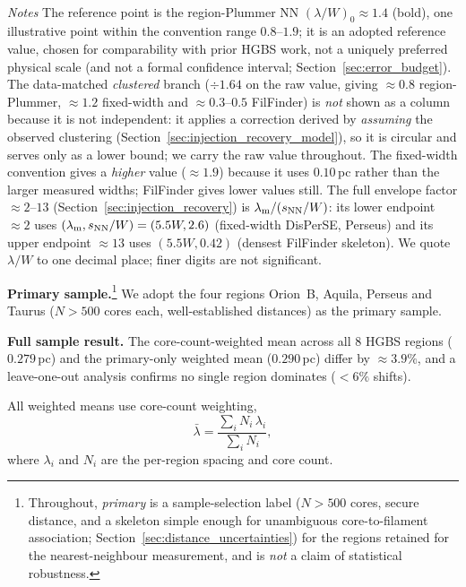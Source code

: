 \documentclass[usenatbib,twoside,twocolumn]{mnras}
\begin{document}
\begin{table}
\\[2pt]
\footnotesize
\emph{Notes} The reference point is the region-Plummer NN $(\lambda/W)_0\approx1.4$ (bold), one illustrative point within the convention range $0.8$--$1.9$; it is an adopted reference value, chosen for comparability with prior HGBS work, not a uniquely preferred physical scale (and not a formal confidence interval; Section~\ref{sec:error_budget}). The data-matched \emph{clustered} branch ($\div1.64$ on the raw value, giving $\approx0.8$ region-Plummer, $\approx1.2$ fixed-width and $\approx0.3$--$0.5$ FilFinder) is \emph{not} shown as a column because it is not independent: it applies a correction derived by \emph{assuming} the observed clustering (Section~\ref{sec:injection_recovery_model}), so it is circular and serves only as a lower bound; we carry the raw value throughout. The fixed-width convention gives a \emph{higher} value ($\approx1.9$) because it uses $0.10$\,pc rather than the larger measured widths; FilFinder gives lower values still. The full envelope factor $\approx2$--$13$ (Section~\ref{sec:injection_recovery}) is $\lambda_{\rm m}/(s_{\rm NN}/W)$: its lower endpoint $\approx2$ uses $(\lambda_{\rm m},s_{\rm NN}/W)=(5.5W,2.6)$ (fixed-width DisPerSE, Perseus) and its upper endpoint $\approx13$ uses $(5.5W,0.42)$ (densest FilFinder skeleton). We quote $\lambda/W$ to one decimal place; finer digits are not significant.
\end{table}

\textbf{Primary sample.}\footnote{Throughout, \emph{primary} is a sample-selection label ($N>500$ cores, secure distance, and a skeleton simple enough for unambiguous core-to-filament association; Section~\ref{sec:distance_uncertainties}) for the regions retained for the nearest-neighbour measurement, and is \emph{not} a claim of statistical robustness.} We adopt the four regions Orion~B, Aquila, Perseus and Taurus ($N>500$ cores each, well-established distances) as the primary sample.

\textbf{Full sample result.} The core-count-weighted mean across all 8 HGBS regions ($0.279$\,pc) and the primary-only weighted mean ($0.290$\,pc) differ by $\approx3.9\%$, and a leave-one-out analysis confirms no single region dominates ($<6\%$ shifts).

All weighted means use core-count weighting,
\begin{equation}
\bar{\lambda} = \frac{\sum_i N_i\,\lambda_i}{\sum_i N_i},
\label{eq:weighting}
\end{equation}
where $\lambda_i$ and $N_i$ are the per-region spacing and core count.
\end{document}
